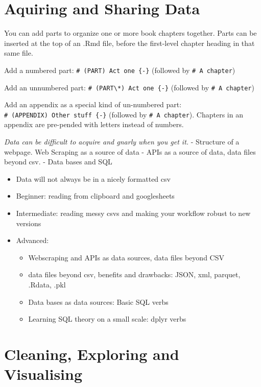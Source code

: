 \documentclass[
  12pt,
]{book}
\providecommand{\tightlist}{%
  \setlength{\itemsep}{0pt}\setlength{\parskip}{0pt}}
\theoremstyle{definition}
\theoremstyle{definition}
\theoremstyle{definition}
\theoremstyle{definition}
\theoremstyle{remark}
\begin{document}
\hypertarget{data}{%
\chapter{Aquiring and Sharing Data}\label{data}}

You can add parts to organize one or more book chapters together. Parts can be inserted at the top of an .Rmd file, before the first-level chapter heading in that same file.

Add a numbered part: \texttt{\#\ (PART)\ Act\ one\ \{-\}} (followed by \texttt{\#\ A\ chapter})

Add an unnumbered part: \texttt{\#\ (PART\textbackslash{}*)\ Act\ one\ \{-\}} (followed by \texttt{\#\ A\ chapter})

Add an appendix as a special kind of un-numbered part: \texttt{\#\ (APPENDIX)\ Other\ stuff\ \{-\}} (followed by \texttt{\#\ A\ chapter}). Chapters in an appendix are pre-pended with letters instead of numbers.

\emph{Data can be difficult to acquire and gnarly when you get it.}
- Structure of a webpage. Web Scraping as a source of data
- APIs as a source of data, data files beyond csv.
- Data bases and SQL

\begin{itemize}
\item
  Data will not always be in a nicely formatted csv
\item
  Beginner: reading from clipboard and googlesheets
\item
  Intermediate: reading messy csvs and making your workflow robust to new versions
\item
  Advanced:

  \begin{itemize}
  \tightlist
  \item
    Webscraping and APIs as data sources, data files beyond CSV
  \item
    data files beyond csv, benefits and drawbacks: JSON, xml, parquet, .Rdata, .pkl
  \item
    Data bases as data sources: Basic SQL verbs
  \item
    Learning SQL theory on a small scale: dplyr verbs
  \end{itemize}
\end{itemize}

\hypertarget{edav}{%
\chapter{Cleaning, Exploring and Visualising}\label{edav}}
\end{document}
